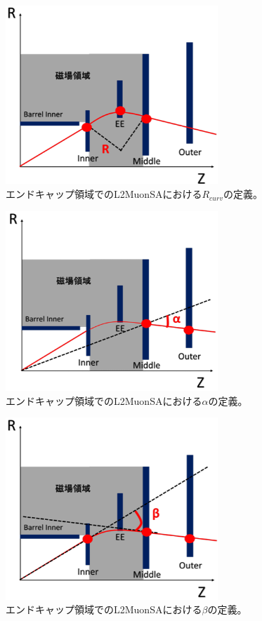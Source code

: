 \begin{figure}[h]
  \centering
  \includegraphics[clip, width=8cm]{fig/3/l2muonSA_Rcurv.png}
  \caption{エンドキャップ領域でのL2MuonSAにおける$R_{curv}$の定義\cite{article:noguchi}。}
  \label{fig:3-7}
\end{figure}

\begin{figure}[h]
  \centering
  \includegraphics[clip, width=8cm]{fig/3/l2muonSA_alpha.png}
  \caption{エンドキャップ領域でのL2MuonSAにおける$\alpha$の定義\cite{article:noguchi}。}
  \label{fig:3-8}
\end{figure}

\begin{figure}[h]
  \centering
  \includegraphics[clip, width=8cm]{fig/3/l2muonSA_beta.png}
  \caption{エンドキャップ領域でのL2MuonSAにおける$\beta$の定義\cite{article:noguchi}。}
  \label{fig:3-9}
\end{figure}



